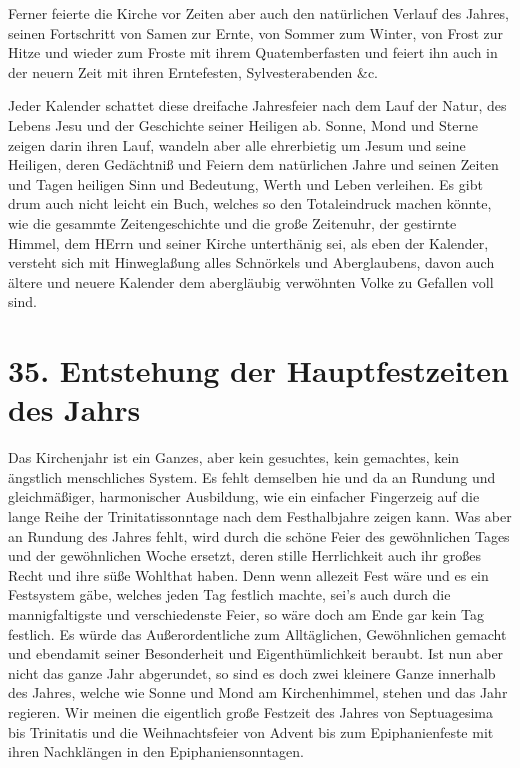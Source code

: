 Ferner feierte die Kirche vor Zeiten aber auch den natürlichen
Verlauf des Jahres, seinen Fortschritt von Samen zur Ernte, von Sommer zum Winter, von Frost zur Hitze und wieder zum Froste mit ihrem Quatemberfasten und feiert ihn auch in der neuern Zeit mit ihren Erntefesten, Sylvesterabenden \&c.

Jeder Kalender schattet diese dreifache Jahresfeier nach dem Lauf der Natur, des Lebens Jesu und der Geschichte seiner Heiligen ab. Sonne, Mond und Sterne zeigen darin ihren Lauf, wandeln aber alle ehrerbietig um Jesum und seine Heiligen, deren Gedächtniß und Feiern dem natürlichen Jahre und seinen Zeiten und Tagen heiligen Sinn und Bedeutung, Werth und Leben verleihen. Es gibt drum auch nicht leicht ein Buch, welches so den Totaleindruck machen könnte, wie die gesammte Zeitengeschichte und die große Zeitenuhr, der gestirnte Himmel, dem HErrn und seiner Kirche unterthänig sei, als eben der Kalender, versteht sich mit Hinweglaßung alles Schnörkels und Aberglaubens, davon auch ältere und neuere Kalender dem abergläubig verwöhnten Volke zu Gefallen voll sind.

\section[35. Entstehung der Hauptfestzeiten]{35. Entstehung der Hauptfestzeiten des Jahrs}

Das Kirchenjahr ist ein Ganzes, aber kein gesuchtes, kein gemachtes, kein ängstlich menschliches System. Es fehlt demselben hie und da an Rundung und gleichmäßiger, harmonischer Ausbildung, wie ein einfacher Fingerzeig auf die lange Reihe der Trinitatissonntage nach dem Festhalbjahre
zeigen kann. Was aber an Rundung des Jahres fehlt, wird durch die schöne Feier des gewöhnlichen Tages und der gewöhnlichen Woche ersetzt, deren stille Herrlichkeit auch ihr großes Recht und ihre süße Wohlthat haben. Denn wenn allezeit Fest wäre und es ein Festsystem gäbe, welches jeden Tag festlich machte, sei’s auch durch die mannigfaltigste und verschiedenste Feier, so wäre doch am Ende gar kein Tag festlich. Es würde das Außerordentliche zum Alltäglichen, Gewöhnlichen gemacht und ebendamit seiner Besonderheit und Eigenthümlichkeit beraubt. Ist nun aber nicht das ganze Jahr abgerundet, so sind es doch zwei kleinere Ganze innerhalb des Jahres, welche wie Sonne und Mond am Kirchenhimmel, stehen und das Jahr regieren. Wir meinen die eigentlich große Festzeit des Jahres von Septuagesima bis Trinitatis und die Weihnachtsfeier von Advent bis zum Epiphanienfeste mit ihren Nachklängen in den Epiphaniensonntagen.

